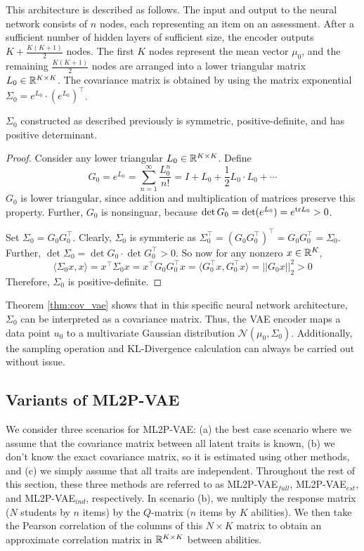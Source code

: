 This architecture is described as follows. The input and output to the neural network consists of $n$ nodes, each representing an item on an assessment. After a sufficient number of hidden layers of sufficient size, the encoder outputs $K + \frac{K(K+1)}{2}$ nodes. The first $K$ nodes represent the mean vector $\mu_0$, and the remaining $\frac{K(K+1)}{2}$ nodes are arranged into a lower triangular matrix $L_0 \in \mathbb{R}^{K\times K}$. The covariance matrix is obtained by using the matrix exponential $\Sigma_0 = e^{L_0} \cdot \left( e^{L_0} \right)^\top$.

\begin{theorem}
  $\Sigma_0$ constructed as described previously is symmetric, positive-definite, and has positive determinant.
  \label{thm:cov_vae}
\end{theorem}
\begin{proof}
  Consider any lower triangular $L_0 \in \mathbb{R}^{K\times K}$. Define 
  \[G_0 = e^{L_0} = \sum_{n=1}^\infty \frac{L_0^n}{n!} = I + L_0 + \frac{1}{2} L_0 \cdot L_0 + \cdots\]
  $G_0$ is lower triangular, since addition and multiplication of matrices preserve this property. Further, $G_0$ is nonsinguar, because $\det G_0 = \det(e^{L_0}) = e^{\text{tr} L_0} > 0$.

  Set $\Sigma_0 = G_0 G_0^\top$. Clearly, $\Sigma_0$ is symmteric as $\Sigma_0^\top = (G_0 G_0^\top)^\top = G_0 G_0^\top = \Sigma_0$. Further, $\det \Sigma_0 = \det G_0 \cdot \det G_0^\top > 0$. So now for any nonzero $x \in \mathbb{R}^K$,
  \[\langle \Sigma_0 x, x \rangle = x^\top \Sigma_0 x = x^\top G_0 G_0^\top x = \langle G_0^\top x, G_0^\top x \rangle = ||G_0 x||_2^2 > 0\]
  Therefore, $\Sigma_0$ is positive-definite.
\end{proof}

Theorem \ref{thm:cov_vae} shows that in this specific neural network architecture, $\Sigma_0$ can be interpreted as a covariance matrix. Thus, the VAE encoder maps a data point $u_0$ to a multivariate Gaussian distribution $\mathcal{N}(\mu_0, \Sigma_0)$. Additionally, the sampling operation and KL-Divergence calculation can always be carried out without issue. 


\subsection{Variants of ML2P-VAE}\label{sec:variants}

We consider three scenarios for ML2P-VAE: (a) the best case scenario where we assume that the covariance matrix between all latent traits is known, (b) we don't know the exact covariance matrix, so it is estimated using other methods, and (c) we simply assume that all traits are independent. Throughout the rest of this section, these three methods are referred to as ML2P-VAE$_{full}$, ML2P-VAE$_{est}$, and ML2P-VAE$_{ind}$, respectively. In scenario (b), we multiply the response matrix ($N$ students by $n$ items) by the $Q$-matrix ($n$ items by $K$ abilities). We then take the Pearson correlation of the columns of this $N\times K$ matrix to obtain an approximate correlation matrix in $\mathbb{R}^{K\times K}$ between abilities.


